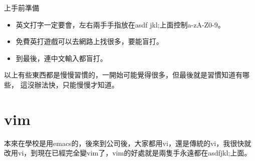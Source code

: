   上手前準備
  \begin{itemize}
    \item 英文打字一定要會，左右兩手手指放在asdf  jkl;上面控制a-zA-Z0-9。
    \item 免費英打遊戲可以去網路上找很多，要能盲打。
    \item 到最後，連中文輸入都盲打。
  \end{itemize}
  以上有些東西都是慢慢習慣的，一開始可能覺得很多，但最後就是習慣知道有哪些，
  這沒辦法快，只能慢慢才知道。

  \section{vim}
    本來在學校是用emacs的，後來到公司後，大家都用vi，還是傳統的vi，我很快就
    改用vi，到現在已經完全變vim了，vim的好處就是兩隻手永遠都在asdfjkl;上面。
